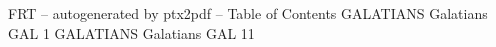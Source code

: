 \id FRT -- autogenerated by ptx2pdf --
\is Table of Contents
\tr {} GALATIANS Galatians GAL 1
\tr {} GALATIANS Galatians GAL 11
